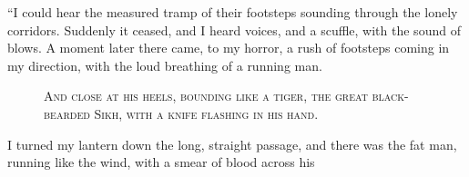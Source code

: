 \documentclass[12pt,english,oneside]{book}
\newcommand{\noun}[1]{\textsc{#1}}
\begin{document}
{}``I could hear the measured tramp of their footsteps sounding through
the lonely corridors. Suddenly it ceased, and I heard voices, and
a scuffle, with the sound of blows. A moment later there came, to
my horror, a rush of footsteps coming in my direction, with the loud
breathing of a running man. %
\begin{figure}[htbp]
\noindent {}

\noindent \begin{center}\noun{And close at his heels, bounding like
a tiger, the great black-bearded Sikh, with a knife flashing in his
hand.}\end{center}
\end{figure}
I turned my lantern down the long, straight passage, and there was
the fat man, running like the wind, with a smear of blood across his
\end{document}
